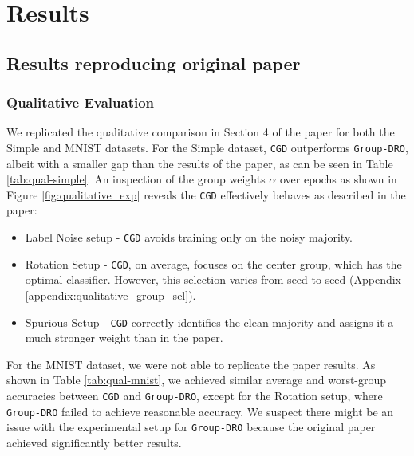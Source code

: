 \section{Results}
\label{sec:results}

\subsection{Results reproducing original paper}


\subsubsection{Qualitative Evaluation}

We replicated the qualitative comparison in Section 4 of the paper for both the Simple and MNIST datasets. For the Simple dataset, \texttt{CGD} outperforms \texttt{Group-DRO}, albeit with a smaller gap than the results of the paper, as can be seen in Table \ref{tab:qual-simple}. An inspection of the group weights $\alpha$ over epochs as shown in Figure \ref{fig:qualitative_exp} reveals the \texttt{CGD} effectively behaves as described in the paper:

\begin{itemize}
    \item Label Noise setup - \texttt{CGD} avoids training only on the noisy majority. 
    \item Rotation Setup - \texttt{CGD}, on average, focuses on the center group, which has the optimal classifier. However, this selection varies from seed to seed (Appendix \ref{appendix:qualitative_group_sel}).
    \item Spurious Setup - \texttt{CGD} correctly identifies the clean majority and assigns it a much stronger weight than in the paper.
\end{itemize}


 For the MNIST dataset, we were not able to replicate the paper results. As shown in Table \ref{tab:qual-mnist}, we achieved similar average and worst-group accuracies between \texttt{CGD} and \texttt{Group-DRO}, except for the Rotation setup, where \texttt{Group-DRO} failed to achieve reasonable accuracy. We suspect there might be an issue with the experimental setup for \texttt{Group-DRO} because the original paper achieved significantly better results.

